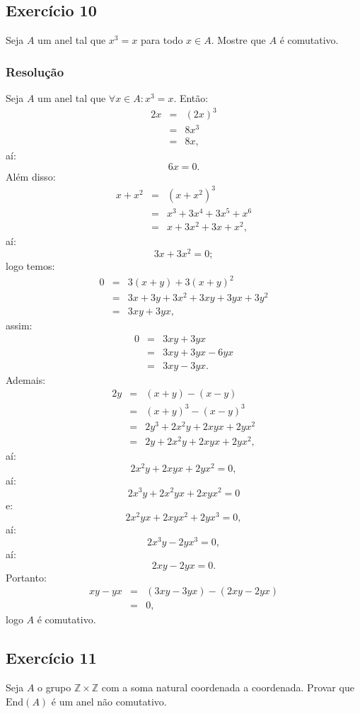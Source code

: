 \documentclass[10pt,a4paper]{article}
\begin{document}
\subsection*{Exercício 10}
Seja $A$ um anel tal que $x^3=x$ para todo $x\in A$. Mostre que $A$ é comutativo.

\subsubsection*{Resolução}

Seja $A$ um anel tal que $\forall x\in A:x^3=x$. Então:
\[
\begin{array}{rcl}
2x&=&(2x)^3\\&=&8x^3\\&=&8x,
\end{array}
\]
aí:
\[
6x=0.
\]
Além disso:
\[
\begin{array}{rcl}
x+x^2&=&(x+x^2)^3\\&=&x^3+3x^4+3x^5+x^6\\&=&x+3x^2+3x+x^2,
\end{array}
\]
aí:
\[
3x+3x^2=0;
\]
logo temos:
\[
\begin{array}{rcl}
0&=&3(x+y)+3(x+y)^2\\&=&3x+3y+3x^2+3xy+3yx+3y^2\\&=&3xy+3yx,
\end{array}
\]
assim:
\[
\begin{array}{rcl}
0&=&3xy+3yx\\&=&3xy+3yx-6yx\\&=&3xy-3yx.
\end{array}
\]
Ademais:
\[
\begin{array}{rcl}
2y&=&(x+y)-(x-y)\\&=&(x+y)^3-(x-y)^3\\&=&2y^3+2x^2y+2xyx+2yx^2\\&=&2y+2x^2y+2xyx+2yx^2,
\end{array}
\]
aí:
\[
2x^2y+2xyx+2yx^2=0,
\]
aí:
\[
2x^3y+2x^2yx+2xyx^2=0
\]
e:
\[
2x^2yx+2xyx^2+2yx^3=0,
\]
aí:
\[
2x^3y-2yx^3=0,
\]
aí:
\[
2xy-2yx=0.
\]
Portanto:
\[
\begin{array}{rcl}
xy-yx&=&(3xy-3yx)-(2xy-2yx)\\&=&0,
\end{array}
\]
logo $A$ é comutativo.

\subsection*{Exercício 11}
Seja $A$ o grupo $\mathbb{Z}\times\mathbb{Z}$ com a soma natural coordenada a coordenada. Provar que $\mathrm{End}(A)$ é um anel não comutativo.
\end{document}
